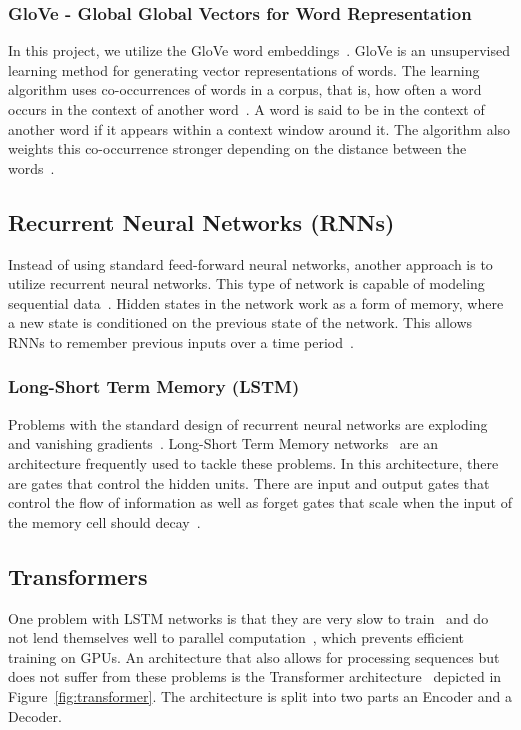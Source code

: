 \documentclass[acmsmall,nonacm]{acmart}
\begin{document}
\subsubsection{GloVe - Global Global Vectors for Word Representation}
In this project, we utilize the GloVe word embeddings~\cite{glove-pennington2014}. GloVe is an unsupervised learning method for generating vector representations of words. The learning algorithm uses co-occurrences of words in a corpus, that is, how often a word occurs in the context of another word~\cite{glove-pennington2014}. A word is said to be in the context of another word if it appears within a context window around it. The algorithm also weights this co-occurrence stronger depending on the distance between the words~\cite{glove-pennington2014}.

\subsection{Recurrent Neural Networks (RNNs)}
Instead of using standard feed-forward neural networks, another approach is to utilize recurrent neural networks. This type of network is capable of modeling sequential data~\cite{rnn-salehinejad2018recent}. Hidden states in the network work as a form of memory, where a new state is conditioned on the previous state of the network. This allows RNNs to remember previous inputs over a time period~\cite{rnn-salehinejad2018recent}. 

\subsubsection{Long-Short Term Memory (LSTM)}
Problems with the standard design of recurrent neural networks are exploding and vanishing gradients~\cite{rnn-salehinejad2018recent}. Long-Short Term Memory networks~\cite{lstm-hochreiter1997long} are an architecture frequently used to tackle these problems. In this architecture, there are gates that control the hidden units. There are input and output gates that control the flow of information as well as forget gates that scale when the input of the memory cell should decay~\cite{rnn-salehinejad2018recent}.

\subsection{Transformers}
One problem with LSTM networks is that they are very slow to train~\cite{rnn-salehinejad2018recent} and do not lend themselves well to parallel computation~\cite{attention-vaswani2017}, which prevents efficient training on GPUs. An architecture that also allows for processing sequences but does not suffer from these problems is the Transformer architecture~\cite{attention-vaswani2017} depicted in Figure~\ref{fig:transformer}. The architecture is split into two parts an Encoder and a Decoder.
\end{document}
